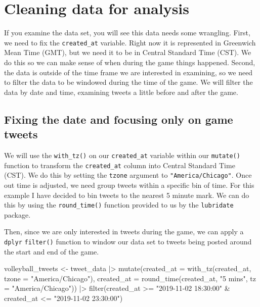 \documentclass[
  letterpaper,
  DIV=11,
  numbers=noendperiod]{scrreprt}
\newenvironment{Shaded}{\begin{snugshade}}{\end{snugshade}}
\newcommand{\AttributeTok}[1]{\textcolor[rgb]{0.40,0.45,0.13}{#1}}
\newcommand{\FunctionTok}[1]{\textcolor[rgb]{0.28,0.35,0.67}{#1}}
\newcommand{\NormalTok}[1]{\textcolor[rgb]{0.00,0.23,0.31}{#1}}
\newcommand{\OtherTok}[1]{\textcolor[rgb]{0.00,0.23,0.31}{#1}}
\newcommand{\SpecialCharTok}[1]{\textcolor[rgb]{0.37,0.37,0.37}{#1}}
\newcommand{\StringTok}[1]{\textcolor[rgb]{0.13,0.47,0.30}{#1}}
\begin{document}
\hypertarget{cleaning-data-for-analysis}{%
\section{Cleaning data for analysis}\label{cleaning-data-for-analysis}}

If you examine the data set, you will see this data needs some
wrangling. First, we need to fix the \texttt{created\_at} variable.
Right now it is represented in Greenwich Mean Time (GMT), but we need it
to be in Central Standard Time (CST). We do this so we can make sense of
when during the game things happened. Second, the data is outside of the
time frame we are interested in examining, so we need to filter the data
to be windowed during the time of the game. We will filter the data by
date and time, examining tweets a little before and after the game.

\hypertarget{fixing-the-date-and-focusing-only-on-game-tweets}{%
\subsection{Fixing the date and focusing only on game
tweets}\label{fixing-the-date-and-focusing-only-on-game-tweets}}

We will use the \texttt{with\_tz()} on our \texttt{created\_at} variable
within our \texttt{mutate()} function to transform the
\texttt{created\_at} column into Central Standard Time (CST). We do this
by setting the \texttt{tzone} argument to \texttt{"America/Chicago"}.
Once out time is adjusted, we need group tweets within a specific bin of
time. For this example I have decided to bin tweets to the nearest 5
minute mark. We can do this by using the \texttt{round\_time()} function
provided to us by the \texttt{lubridate} package.

Then, since we are only interested in tweets during the game, we can
apply a \texttt{dplyr} \texttt{filter()} function to window our data set
to tweets being posted around the start and end of the game.

\begin{Shaded}
\begin{Highlighting}[]
\NormalTok{volleyball\_tweets }\OtherTok{\textless{}{-}}\NormalTok{ tweet\_data }\SpecialCharTok{|\textgreater{}}
  \FunctionTok{mutate}\NormalTok{(}\AttributeTok{created\_at =} \FunctionTok{with\_tz}\NormalTok{(created\_at, }\AttributeTok{tzone =} \StringTok{"America/Chicago"}\NormalTok{),}
         \AttributeTok{created\_at =} \FunctionTok{round\_time}\NormalTok{(created\_at, }\StringTok{"5 mins"}\NormalTok{, }\AttributeTok{tz =} \StringTok{"America/Chicago"}\NormalTok{)) }\SpecialCharTok{|\textgreater{}} 
  \FunctionTok{filter}\NormalTok{(created\_at }\SpecialCharTok{\textgreater{}=} \StringTok{"2019{-}11{-}02 18:30:00"} \SpecialCharTok{\&}\NormalTok{ created\_at }\SpecialCharTok{\textless{}=} \StringTok{"2019{-}11{-}02 23:30:00"}\NormalTok{) }
\end{Highlighting}
\end{Shaded}
\end{document}
